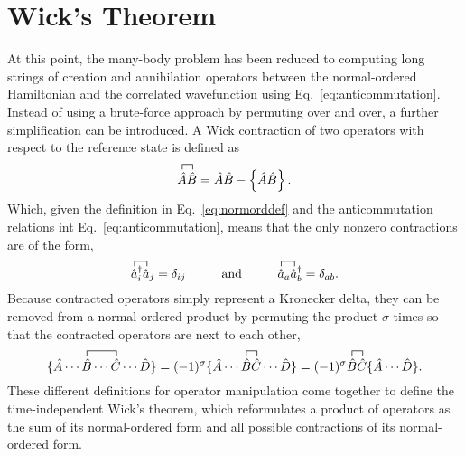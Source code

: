 \documentclass[thesis.tex]{subfiles}
\begin{document}
\section{Wick's Theorem}
At this point, the many-body problem has been reduced to computing long strings of creation and annihilation operators between the normal-ordered Hamiltonian and the correlated wavefunction using Eq.\ \eqref{eq:anticommutation}.  Instead of using a brute-force approach by permuting over and over, a further simplification can be introduced.  A Wick contraction of two operators with respect to the reference state is defined as
\begin{equation} \label{eq:wick1}
  \contraction[1.0ex]{}{\hat{A}}{}{\hat{B}}
  \hat{A}\hat{B} = \hat{A}\hat{B} - \normord{\hat{A}\hat{B}}.
\end{equation}
Which, given the definition in Eq.\ \eqref{eq:normorddef} and the anticommutation relations int Eq.\ \eqref{eq:anticommutation}, means that the only nonzero contractions are of the form,
\begin{equation} \label{eq:wick2}
  \contraction[1.0ex]{}{\hat{a}}{^{\dagger}_{i}}{\hat{a}}
  \hat{a}^{\dagger}_{i}\hat{a}_{j} = \delta_{ij} \hspace{1.0cm} \text{and} \hspace{1.0cm}
  \contraction[1.0ex]{}{\hat{a}}{_{a}}{\hat{a}}
  \hat{a}_{a}\hat{a}_{b}^{\dagger} = \delta_{ab}.
\end{equation}
Because contracted operators simply represent a Kronecker delta, they can be removed from a normal ordered product by permuting the product $\sigma$ times so that the contracted operators are next to each other,
\begin{equation} \label{eq:wick3}
  \contraction[1.0ex]{\{ \hat{A}\cdots}{\hat{B}}{\cdots}{\hat{C}}
  \{ \hat{A}\cdots\hat{B}\cdots\hat{C}\cdots\hat{D} \} = (-1)^{\sigma}
  \contraction[1.0ex]{\{ \hat{A}\cdots}{\hat{B}}{}{\hat{C}}
  \{ \hat{A}\cdots\hat{B}\hat{C}\cdots\hat{D} \} = (-1)^{\sigma}
  \contraction[1.0ex]{}{\hat{B}}{}{\hat{C}}
  \hat{B}\hat{C}\{ \hat{A}\cdots\hat{D} \}.
\end{equation}
These different definitions for operator manipulation come together to define the time-independent Wick's theorem, which reformulates a product of operators as the sum of its normal-ordered form and all possible contractions of its normal-ordered form.
\end{document}
